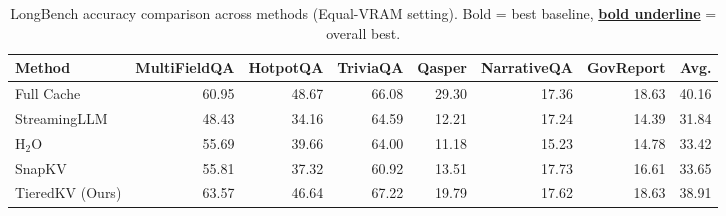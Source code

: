 \begin{table}[t]
\centering\small
\setlength{\tabcolsep}{4pt}
\caption{LongBench accuracy comparison across methods (Equal-VRAM setting). Bold = best baseline, \textbf{\underline{bold underline}} = overall best.}
\label{tab:accuracy_equivram}
\begin{tabular}{lrrrrrrr}
\toprule
\textbf{Method} & \textbf{MultiFieldQA} & \textbf{HotpotQA} & \textbf{TriviaQA} & \textbf{Qasper} & \textbf{NarrativeQA} & \textbf{GovReport} & \textbf{Avg.} \\
\midrule
Full Cache & 60.95 & 48.67 & 66.08 & 29.30 & 17.36 & 18.63 & 40.16 \\
StreamingLLM & 48.43 & 34.16 & 64.59 & 12.21 & 17.24 & 14.39 & 31.84 \\
H$_2$O & 55.69 & 39.66 & 64.00 & 11.18 & 15.23 & 14.78 & 33.42 \\
SnapKV & 55.81 & 37.32 & 60.92 & 13.51 & 17.73 & 16.61 & 33.65 \\
TieredKV (Ours) & 63.57 & 46.64 & 67.22 & 19.79 & 17.62 & 18.63 & 38.91 \\
\bottomrule
\end{tabular}
\end{table}
